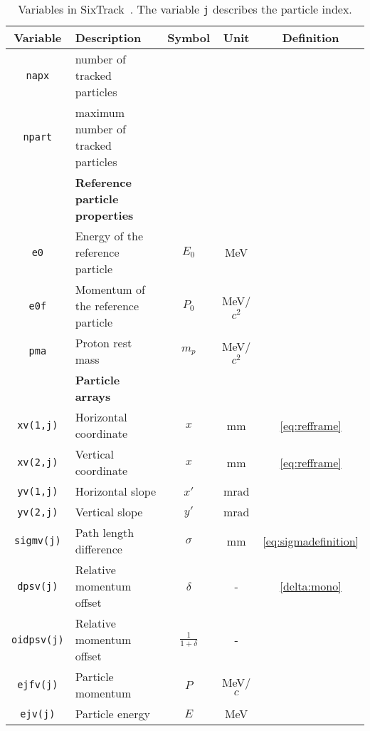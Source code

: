 \begin{appendices}
\begin{table}[b]
\centering
\caption{Variables in SixTrack~\cite{STdevwiki}. The variable \texttt{j} describes the particle index.}
\label{tab:sixtrack_variables}
\begin{tabular}{clccc}
\toprule
Variable             & Description                                   & Symbol     & Unit & Definition  \\ \midrule
\texttt{napx}        & number of tracked particles                   &                      &      &   \\
\texttt{npart}       & maximum number of tracked particles           &                      &      &   \\ \midrule
 & \textbf{Reference particle properties} \\ \midrule
\texttt{e0}          & Energy of the reference particle              & $E_0$                & MeV  &                      \\
\texttt{e0f}         & Momentum of the reference particle            & $P_0$                & MeV/$c^2$  &                      \\ 
\texttt{pma}         & Proton rest mass            & $m_p$                & MeV/$c^2$  &               \\ \midrule
 & \textbf{Particle arrays} \\ \midrule
\texttt{xv(1,j)}     & Horizontal coordinate                         & $x$                  & mm   & \eqref{eq:refframe}  \\
\texttt{xv(2,j)}     & Vertical coordinate                           & $x$                  & mm   & \eqref{eq:refframe}  \\
\texttt{yv(1,j)}     & Horizontal slope                              & $x'$                 & mrad \\
\texttt{yv(2,j)}     & Vertical slope                                & $y'$                 & mrad \\
\texttt{sigmv(j)}    & Path length difference                        & $\sigma$             & mm   & \eqref{eq:sigmadefinition}  \\
\texttt{dpsv(j)}     & Relative momentum offset                      & $\delta$             & -    &  \eqref{delta:mono}    \\
\texttt{oidpsv(j)}   & Relative momentum offset                      & $\frac{1}{1+\delta}$ & -    &     \\
\texttt{ejfv(j)}     & Particle momentum                             & $P$                  & MeV/$c$    &     \\
\texttt{ejv(j)}      & Particle energy                               & $E$                  & MeV    &     \\ \bottomrule
\end{tabular}
\end{table}





\end{appendices}
